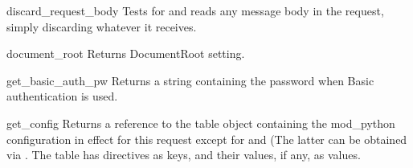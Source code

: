 \begin{methoddesc}[request]{discard_request_body}{}
  Tests for and reads any message body in the request, simply discarding
  whatever it receives.
\end{methoddesc}

\begin{methoddesc}[request]{document_root}{}
  Returns DocumentRoot setting.
\end{methoddesc}

\begin{methoddesc}[request]{get_basic_auth_pw}{}
  Returns a string containing the password when Basic authentication is
  used.
\end{methoddesc}

\begin{methoddesc}[request]{get_config}{}
  Returns a reference to the table object containing the mod_python
  configuration in effect for this request except for
   and  (The latter can be
  obtained via . The table has directives as
  keys, and their values, if any, as values.
\end{methoddesc}

